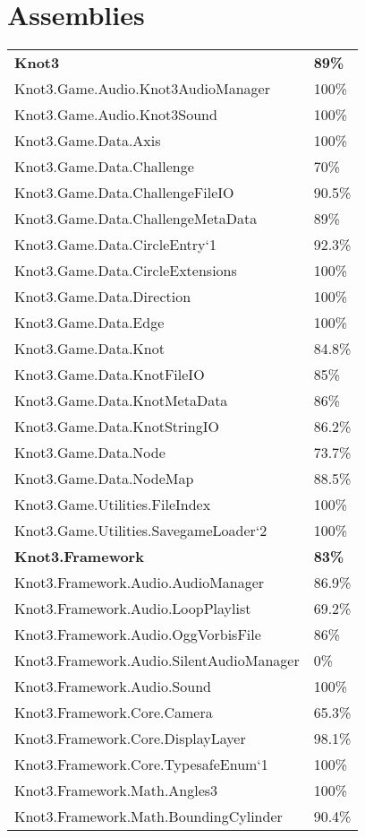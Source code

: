 \documentclass[a4paper,10pt]{article}
\begin{document}
\section{Assemblies}
\begin{longtable}[l]{ll}
\textbf{Knot3} & \textbf{89\%}\\
Knot3.Game.Audio.Knot3AudioManager & 100\%\\
Knot3.Game.Audio.Knot3Sound & 100\%\\
Knot3.Game.Data.Axis & 100\%\\
Knot3.Game.Data.Challenge & 70\%\\
Knot3.Game.Data.ChallengeFileIO & 90.5\%\\
Knot3.Game.Data.ChallengeMetaData & 89\%\\
Knot3.Game.Data.CircleEntry`1 & 92.3\%\\
Knot3.Game.Data.CircleExtensions & 100\%\\
Knot3.Game.Data.Direction & 100\%\\
Knot3.Game.Data.Edge & 100\%\\
Knot3.Game.Data.Knot & 84.8\%\\
Knot3.Game.Data.KnotFileIO & 85\%\\
Knot3.Game.Data.KnotMetaData & 86\%\\
Knot3.Game.Data.KnotStringIO & 86.2\%\\
Knot3.Game.Data.Node & 73.7\%\\
Knot3.Game.Data.NodeMap & 88.5\%\\
Knot3.Game.Utilities.FileIndex & 100\%\\
Knot3.Game.Utilities.SavegameLoader`2 & 100\%\\
\textbf{Knot3.Framework} & \textbf{83\%}\\
Knot3.Framework.Audio.AudioManager & 86.9\%\\
Knot3.Framework.Audio.LoopPlaylist & 69.2\%\\
Knot3.Framework.Audio.OggVorbisFile & 86\%\\
Knot3.Framework.Audio.SilentAudioManager & 0\%\\
Knot3.Framework.Audio.Sound & 100\%\\
Knot3.Framework.Core.Camera & 65.3\%\\
Knot3.Framework.Core.DisplayLayer & 98.1\%\\
Knot3.Framework.Core.TypesafeEnum`1 & 100\%\\
Knot3.Framework.Math.Angles3 & 100\%\\
Knot3.Framework.Math.BoundingCylinder & 90.4\%\\

\end{longtable}
\end{document}

